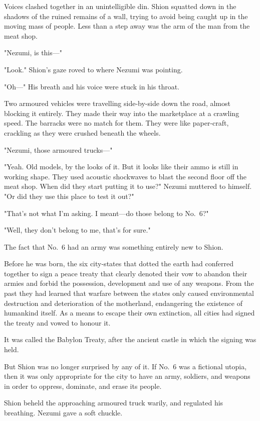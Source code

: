 Voices clashed together in an unintelligible din. Shion squatted down in
the shadows of the ruined remains of a wall, trying to avoid being
caught up in the moving mass of people. Less than a step away was the
arm of the man from the meat shop.

"Nezumi, is this---"

"Look." Shion's gaze roved to where Nezumi was pointing.

"Oh---" His breath and his voice were stuck in his throat.

Two armoured vehicles were travelling side-by-side down the road, almost
blocking it entirely. They made their way into the marketplace at a
crawling speed. The barracks were no match for them. They were like
paper-craft, crackling as they were crushed beneath the wheels.

"Nezumi, those armoured trucks---"

"Yeah. Old models, by the looks of it. But it looks like their ammo is
still in working shape. They used acoustic shockwaves to blast the
second floor off the meat shop. When did they start putting it to use?"
Nezumi muttered to himself. "Or did they use this place to test it out?"

"That's not what I'm asking. I meant---do those belong to No.~6?"

"Well, they don't belong to me, that's for sure."

The fact that No.~6 had an army was something entirely new to Shion.

Before he was born, the six city-states that dotted the earth had
conferred together to sign a peace treaty that clearly denoted their vow
to abandon their armies and forbid the possession, development and use
of any weapons. From the past they had learned that warfare between the
states only caused environmental destruction and deterioration of the
motherland, endangering the existence of humankind itself. As a means to
escape their own extinction, all cities had signed the treaty and vowed
to honour it.

It was called the Babylon Treaty, after the ancient castle in which the
signing was held.

But Shion was no longer surprised by any of it. If No.~6 was a fictional
utopia, then it was only appropriate for the city to have an army,
soldiers, and weapons in order to oppress, dominate, and erase its
people.

Shion beheld the approaching armoured truck warily, and regulated his
breathing. Nezumi gave a soft chuckle.

